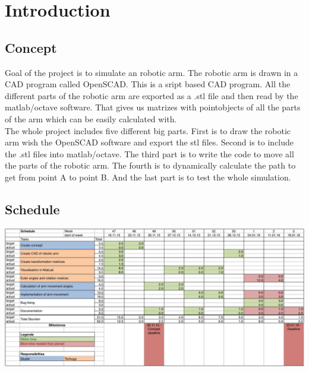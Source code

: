 \chapter{Introduction}
\section{Concept}
Goal of the project is to simulate an robotic arm. The robotic arm is drawn in a CAD program called OpenSCAD. This is a sript based CAD program. All the different parts of the robotic arm are exported as a .stl file and then read by the matlab/octave software. That gives us matrizes with pointobjects of all the parts of the arm which can be easily calculated with.\\
The whole project includes five different big parts. First is to draw the robotic arm wish the OpenSCAD software and export the stl files. Second is to include the .stl files into matlab/octave. The third part is to write the code to move all the parts of the robotic arm. The fourth is to dynamically calculate the path to get from point A to point B. And the last part is to test the whole simulation.\\

\section{Schedule}
\includegraphics[width=\textwidth]{imgs/schedule.jpg}